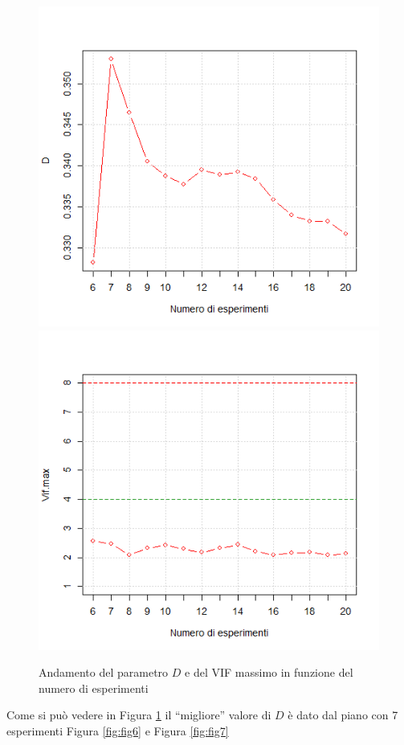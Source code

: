 \documentclass[
  11pt,
]{book}
\begin{document}
\begin{figure}[ht]
\includegraphics[width=0.5\linewidth]{Immagini/D_opt/04_es1_pticandidati} \includegraphics[width=0.5\linewidth]{Immagini/D_opt/05_es1_pticandidati} \caption{Andamento del parametro $D$ e del VIF massimo in funzione del numero di esperimenti}\label{fig:fig3}
\end{figure}

Come si può vedere in Figura \ref{fig:fig3} il ``migliore'' valore di \(D\) è dato dal piano con 7 esperimenti Figura \ref{fig:fig6} e Figura \ref{fig:fig7}
\end{document}
